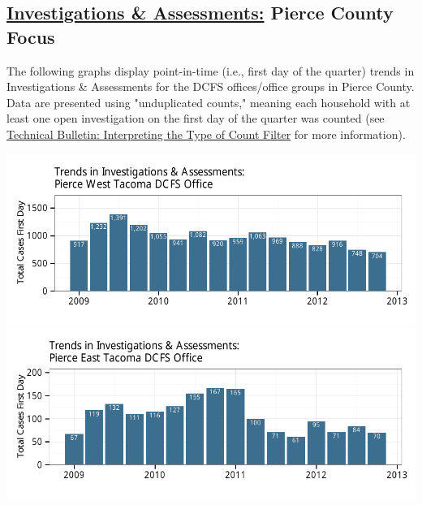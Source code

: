 \documentclass{article}\usepackage{graphicx, color}
\makeatletter
\def\maxwidth{ %
  \ifdim\Gin@nat@width>\linewidth
    \linewidth
  \else
    \Gin@nat@width
  \fi
}
\newenvironment{knitrout}{}{} %
\makeatother
\begin{document}
\subsection{\href{http://www.partnersforourchildren.org//child-well-being/visualizations/investigations-assessments/trends}
{Investigations \& Assessments:} Pierce County Focus}
The following graphs display point-in-time (i.e., first day of the quarter) trends in Investigations \& Assessments for the DCFS offices/office groups in Pierce County.  Data are presented using "unduplicated counts," meaning each household with at least one open investigation on the first day of the quarter was counted (see \href{http://http://www.partnersforourchildren.org/publications/using-different-count-types-data-portal}{Technical Bulletin: Interpreting the Type of Count Filter} for more information).  
\nopagebreak[2]
\begin{knitrout}
\color{fgcolor}

{\centering \includegraphics[width=\maxwidth]{figure/ia_focus1} 
\includegraphics[width=\maxwidth]{figure/ia_focus2} 

}



\end{knitrout}
\end{document}

